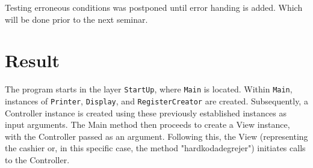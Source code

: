 \documentclass[a4paper]{scrreprt}
\newenvironment{longlisting}{\captionsetup{type=listing}}{}
\begin{document}
Testing erroneous conditions was postponed until error handing is added.
Which will be done prior to the next seminar.
%
%



%
%

\newpage
\chapter{Result}
\label{sec:result}
The program starts in the layer \verb|StartUp|,
where \verb|Main| is located.
Within \verb|Main|, instances of \verb|Printer|,
\verb|Display|, and \verb|RegisterCreator| are created.
Subsequently, a Controller instance is created using these previously established instances as input arguments.
The Main method then proceeds to create a View instance,
with the Controller passed as an argument.
Following this,
the View (representing the cashier or, in this specific case, the method "hardkodadegrejer")
initiates calls to the Controller.
\end{document}

